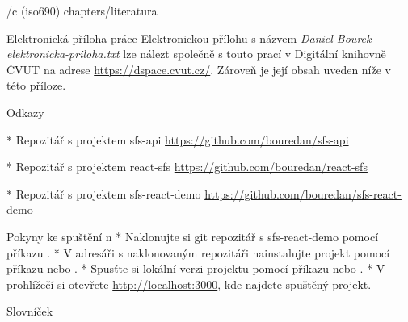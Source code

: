 
\bibchap
\usebib/c (iso690) chapters/literatura

 Elektronická příloha práce
Elektronickou přílohu s názvem {\em Daniel-Bourek-elektronicka-priloha.txt} lze nálezt společně s touto prací v 
Digitální knihovně ČVUT na adrese \url{https://dspace.cvut.cz/}. Zároveň je její obsah uveden níže v této příloze.

\sec Odkazy

\begitems

* Repozitář s projektem sfs-api\nl
\url{https://github.com/bouredan/sfs-api}\nl

* Repozitář s projektem react-sfs\nl
\url{https://github.com/bouredan/react-sfs}\nl

* Repozitář s projektem sfs-react-demo\nl
\url{https://github.com/bouredan/sfs-react-demo}

\enditems

\sec Pokyny ke spuštění
\begitems \style n
* Naklonujte si git repozitář s sfs-react-demo pomocí příkazu .
* V adresáři s naklonovaným repozitáři nainstalujte projekt pomocí příkazu  nebo .
* Spusťte si lokální verzi projektu pomocí příkazu  nebo .
* V prohlížečí si otevřete \url{http://localhost:3000}, kde najdete spuštěný projekt.
\enditems

\app Slovníček 
\makeglos

